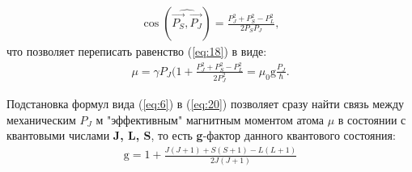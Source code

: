 \begin{gather} 
\label{eq:19b} 
\cos(\widehat{\vec{P_S},\vec{P_J}})=\frac{P_J^2+P_S^2-P_L^2}{2P_S P_J},
\end{gather}
что позволяет переписать равенство (\ref{eq:18}) в виде:
\begin{gather} 
\label{eq:20} 
\mu=\gamma P_J(1+\frac{P_J^2+P_S^2-P_L^2}{2P_J^2}=\mu_0 \text{g} \frac{P_J}{\hbar}.
\end{gather}
 
 Подстановка формул вида (\ref{eq:6}) в (\ref{eq:20}) позволяет сразу найти связь между механическим $P_J$ м "эффективным" магнитным моментом атома $\mu$ в состоянии с квантовыми числами \textbf{J, L, S}, то есть \textbf{g}-фактор данного квантового состояния:
\begin{gather} 
\label{eq:21} 
\text{g}=1+\frac{J(J+1)+S(S+1)-L(L+1)}{2J(J+1)}
\end{gather}